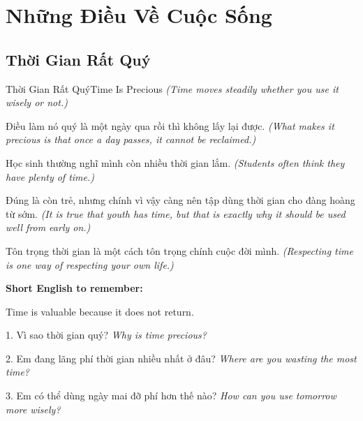 \chapter{Những Điều Về Cuộc Sống}

\section{Thời Gian Rất Quý}
\begin{truyen}{Thời Gian Rất Quý}{Time Is Precious}
\textit{(Time moves steadily whether you use it wisely or not.)}

Điều làm nó quý là một ngày qua rồi thì không lấy lại được.
\textit{(What makes it precious is that once a day passes, it cannot be reclaimed.)}

Học sinh thường nghĩ mình còn nhiều thời gian lắm.
\textit{(Students often think they have plenty of time.)}

Đúng là còn trẻ, nhưng chính vì vậy càng nên tập dùng thời gian cho đàng hoàng từ sớm.
\textit{(It is true that youth has time, but that is exactly why it should be used well from early on.)}
\end{truyen}

\begin{baihoc}
Tôn trọng thời gian là một cách tôn trọng chính cuộc đời mình.
\textit{(Respecting time is one way of respecting your own life.)}
\end{baihoc}

\begin{ghinhoanh}
\textbf{Short English to remember:}

Time is valuable because it does not return.

\end{ghinhoanh}

\begin{tuhocnhanh}
1. Vì sao thời gian quý? \textit{Why is time precious?}

2. Em đang lãng phí thời gian nhiều nhất ở đâu? \textit{Where are you wasting the most time?}

3. Em có thể dùng ngày mai đỡ phí hơn thế nào? \textit{How can you use tomorrow more wisely?}
\end{tuhocnhanh}
\ngancach

